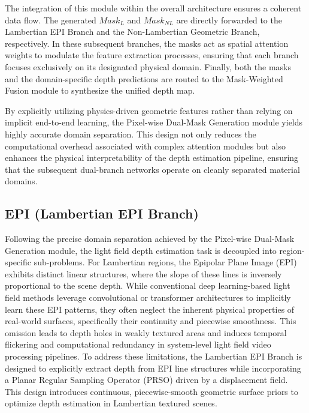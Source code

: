 The integration of this module within the overall architecture ensures a coherent data flow. The generated $Mask_L$ and $Mask_{NL}$ are directly forwarded to the Lambertian EPI Branch and the Non-Lambertian Geometric Branch, respectively. In these subsequent branches, the masks act as spatial attention weights to modulate the feature extraction processes, ensuring that each branch focuses exclusively on its designated physical domain. Finally, both the masks and the domain-specific depth predictions are routed to the Mask-Weighted Fusion module to synthesize the unified depth map.

By explicitly utilizing physics-driven geometric features rather than relying on implicit end-to-end learning, the Pixel-wise Dual-Mask Generation module yields highly accurate domain separation. This design not only reduces the computational overhead associated with complex attention modules but also enhances the physical interpretability of the depth estimation pipeline, ensuring that the subsequent dual-branch networks operate on cleanly separated material domains.

\subsection{EPI (Lambertian EPI Branch)}

Following the precise domain separation achieved by the Pixel-wise Dual-Mask Generation module, the light field depth estimation task is decoupled into region-specific sub-problems. For Lambertian regions, the Epipolar Plane Image (EPI) exhibits distinct linear structures, where the slope of these lines is inversely proportional to the scene depth. While conventional deep learning-based light field methods leverage convolutional or transformer architectures to implicitly learn these EPI patterns, they often neglect the inherent physical properties of real-world surfaces, specifically their continuity and piecewise smoothness. This omission leads to depth holes in weakly textured areas and induces temporal flickering and computational redundancy in system-level light field video processing pipelines. To address these limitations, the Lambertian EPI Branch is designed to explicitly extract depth from EPI line structures while incorporating a Planar Regular Sampling Operator (PRSO) driven by a displacement field. This design introduces continuous, piecewise-smooth geometric surface priors to optimize depth estimation in Lambertian textured scenes.

